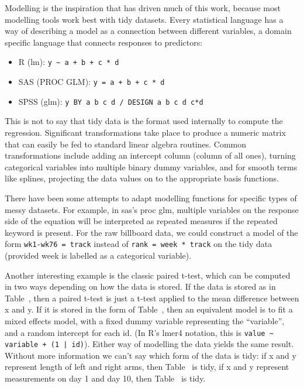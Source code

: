 \documentclass[article]{jss}
\begin{document}
Modelling is the inspiration that has driven much of this work, because most modelling tools work best with tidy datasets. Every statistical language has a way of describing a model as a connection between different variables, a domain specific language that connects responses to predictors: 

\begin{itemize}

  \item R (lm): \verb|y ~ a + b + c * d|

  \item SAS (PROC GLM): \verb|y = a + b + c * d|

  \item SPSS (glm): \verb|y BY a b c d / DESIGN a b c d c*d |

\end{itemize}

This is not to say that tidy data is the format used internally to compute the regression. Significant transformations take place to produce a numeric matrix that can easily be fed to standard linear algebra routines. Common transformations include adding an intercept column (column of all ones), turning categorical variables into multiple binary dummy variables, and for smooth terms like splines, projecting the data values on to the appropriate basis functions.


There have been some attempts to adapt modelling functions for specific types of messy datasets. For example, in {\sc sas}'s {\sc proc glm}, multiple variables on the response side of the equation will be interpreted as repeated measures if the {\sc repeated} keyword is present. For the raw billboard data, we could construct a model of the form \verb|wk1-wk76 = track| instead of \verb|rank = week * track| on the tidy data (provided week is labelled as a categorical variable). 

Another interesting example is the classic paired t-test, which can be computed in two ways depending on how the data is stored. If the data is stored as in Table~, then a paired t-test is just a t-test applied to the mean difference between x and y. If it is stored in the form of Table~, then an equivalent model is to fit a mixed effects model, with a fixed dummy variable representing the ``variable'', and a random intercept for each id. (In R's lmer4 notation, this is \verb#value ~ variable + (1 | id)#). Either way of modelling the data yields the same result. Without more information we can't say which form of the data is tidy: if x and y represent length of left and right arms, then Table~ is tidy, if x and y represent measurements on day 1 and day 10, then Table~ is tidy.
\end{document}
